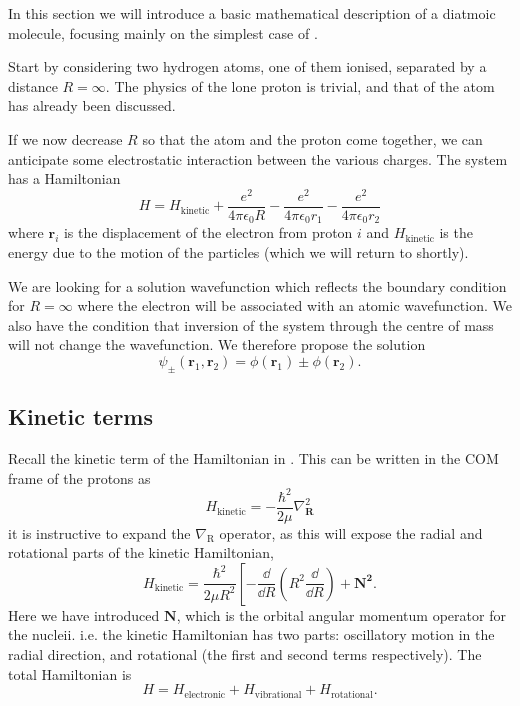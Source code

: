 In this section we will introduce a basic mathematical description of a diatmoic
molecule, focusing mainly on the simplest case of .

Start by considering two hydrogen atoms, one of them ionised, separated by a
distance $R = \infty$. The physics of the lone proton is trivial, and that of
the atom has already been discussed.

If we now decrease $R$ so that the atom and the proton come together, we can
anticipate some electrostatic interaction between the various charges. The
system has a Hamiltonian
%
\begin{equation}
  H = H_\text{kinetic} + \frac{e^2}{4\pi\epsilon_0 R} -
  \frac{e^2}{4\pi\epsilon_0 r_1} - \frac{e^2}{4\pi\epsilon_0 r_2}
\end{equation}
%
where $\mathbf{r}_i$ is the displacement of the electron from proton $i$ and
$H_\text{kinetic}$ is the energy due to the motion of the particles (which we
will return to shortly).

We are looking for a solution wavefunction which reflects the boundary condition
for $R=\infty$ where the electron will be associated with an atomic
wavefunction. We also have the condition that inversion of the system through
the centre of mass will not change the wavefunction. We therefore propose the
solution
%
\begin{equation}
  \psi_\pm(\mathbf{r}_1, \mathbf{r}_2) = \phi(\mathbf{r}_1) \pm \phi(\mathbf{r}_2).
\end{equation}
%


\subsection{Kinetic terms}

Recall the kinetic term of the Hamiltonian in . This can be
written in the COM frame of the protons as
%
\begin{equation}
  H_\text{kinetic} = - \frac{\hbar^2}{2\mu} \nabla^2_\mathbf{R} %
\end{equation}
it is instructive to expand the $\nabla_\mathrm{R}$ operator, as this will
expose the radial and rotational parts of the kinetic Hamiltonian,
\begin{equation}
  H_\text{kinetic} = \frac{\hbar^2}{2\mu R^2}\left[ -\frac{\dd}{\dd R}\left(R^2
  \frac{\dd}{\dd R} \right) + \mathbf{N^2}.
  \label{basics:eq:Hkinetic}
\end{equation}
Here we have introduced $\mathbf{N}$, which is the orbital angular momentum
operator for the nucleii. i.e. the kinetic Hamiltonian has two parts:
oscillatory motion in the radial direction, and rotational (the first and second
terms respectively). The total Hamiltonian is
\begin{equation}
  H = H_\text{electronic} + H_\text{vibrational} + H_\text{rotational}.
\end{equation}

